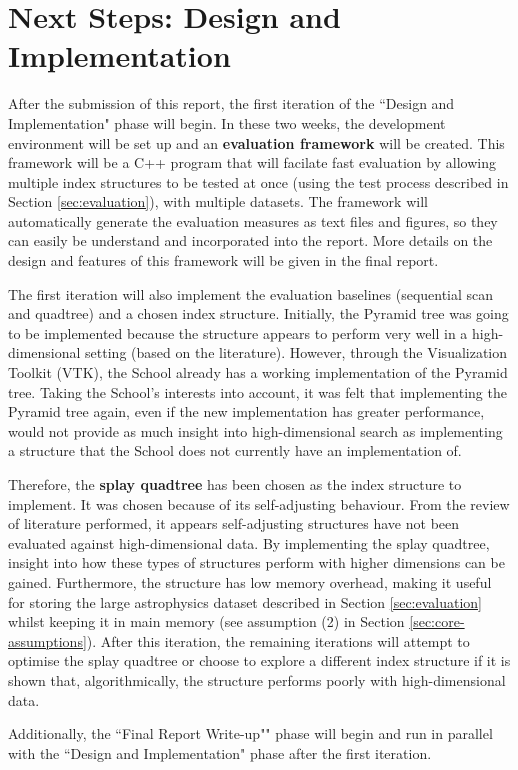 \section{Next Steps: Design and Implementation}
\label{sec:next-steps}

After the submission of this report, the first iteration of the ``Design and Implementation" phase will begin. In these two weeks, the development environment will be set up and an \textbf{evaluation framework} will be created. This framework will be a C++ program that will facilate fast evaluation by allowing multiple index structures to be tested at once (using the test process described in Section \ref{sec:evaluation}), with multiple datasets. The framework will automatically generate the evaluation measures as text files and figures, so they can easily be understand and incorporated into the report. More details on the design and features of this framework will be given in the final report.

The first iteration will also implement the evaluation baselines (sequential scan and quadtree) and a chosen index structure. Initially, the Pyramid tree was going to be implemented because the structure appears to perform very well in a high-dimensional setting (based on the literature). However, through the Visualization Toolkit (VTK)\cite{vtk}, the School already has a working implementation of the Pyramid tree. Taking the School's interests into account, it was felt that implementing the Pyramid tree again, even if the new implementation has greater performance, would not provide as much insight into high-dimensional search as implementing a structure that the School does not currently have an implementation of.

Therefore, the \textbf{splay quadtree} has been chosen as the index structure to implement. It was chosen because of its self-adjusting behaviour. From the review of literature performed, it appears self-adjusting structures have not been evaluated against high-dimensional data. By implementing the splay quadtree, insight into how these types of structures perform with higher dimensions can be gained. Furthermore, the structure has low memory overhead, making it useful for storing the large astrophysics dataset described in Section \ref{sec:evaluation} whilst keeping it in main memory (see assumption (2) in Section \ref{sec:core-assumptions}). After this iteration, the remaining iterations will attempt to optimise the splay quadtree or choose to explore a different index structure if it is shown that, algorithmically, the structure performs poorly with high-dimensional data.

Additionally, the ``Final Report Write-up"" phase will begin and run in parallel with the ``Design and Implementation" phase after the first iteration.
